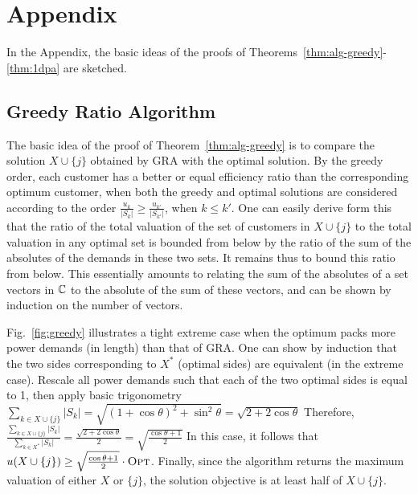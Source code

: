 \vspace{-10pt}
\section{Appendix} \label{sec:append}

In the Appendix, the basic ideas of the proofs of Theorems~\ref{thm:alg-greedy}-\ref{thm:1dpa} are sketched.

\vspace{-10pt}
\subsection{Greedy Ratio Algorithm}

The basic idea of the proof of Theorem~\ref{thm:alg-greedy} is to compare the solution $X \cup \{j\}$ obtained by {\sc GRA} with the optimal solution. By the greedy order, each customer has a better or equal efficiency ratio than the corresponding optimum customer, when both the greedy and optimal solutions are considered according to the order $\frac{u_k}{|S_k|} \ge \frac{u_{k'}}{|S_{k'}|}$, when $k \le k'$. One can easily derive form this that the ratio of the total valuation of the set of customers in $X \cup \{j\}$ to the total valuation in any optimal set is bounded from below by the ratio of the sum of the absolutes of the demands in these two sets. It remains thus to bound  this ratio from below. This essentially amounts to relating the sum of the absolutes of a set vectors in $\mathbb C$ to the absolute of the sum of these vectors, and can be shown by induction on the number of vectors. 

Fig.~\ref{fig:greedy} illustrates a tight extreme case when the optimum packs more power demands (in length) than that of {\sc GRA}. One can show by induction that the two  sides corresponding to $X^*$ (optimal sides) are equivalent (in the extreme case). Rescale all power demands such that each of the two optimal sides is equal to 1, then apply basic trigonometry 
$\sum_{k \in X \cup \{j\}}|S_k| = \sqrt{(1+\cos \theta)^2 + \sin^2 \theta} = \sqrt{2 + 2\cos \theta}$
Therefore, $\frac{\sum_{k \in X \cup \{j\} } |S_k|}{\sum_{k \in X^*} |S_k|} = \frac{\sqrt{2 + 2\cos \theta}}{2}=\sqrt{\frac{\cos \theta + 1}{2}}$
In this case, it follows that $u(X \cup \{j\}) \ge \sqrt{\frac{\cos \theta + 1}{2}} \cdot \textsc{Opt}$. Finally, since the algorithm returns the maximum valuation of either $X$ or $\{j\}$, the solution objective is at least half of $X \cup \{j\}$.


